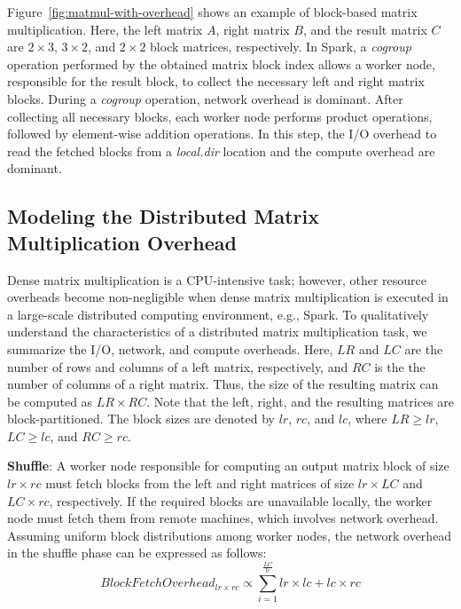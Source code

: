 \documentclass[10pt, conference, compsocconf]{IEEEtran}
\begin{document}
Figure~\ref{fig:matmul-with-overhead} shows an example of block-based matrix multiplication. Here, the left matrix $A$, right matrix $B$, and the result matrix $C$ are  $2 \times 3$,  $3 \times 2$, and $2 \times 2$ block matrices, respectively. In Spark, a \textit{cogroup} operation performed by the obtained matrix block index allows a worker node, responsible for the result block, to collect the necessary left and right matrix blocks. During a \textit{cogroup} operation, network overhead is dominant. After collecting all necessary blocks, each worker node performs product operations, followed by element-wise addition operations. In this step, the I/O overhead to read the fetched blocks from a \textit{local.dir} location and the compute overhead are dominant.

\subsection{Modeling the  Distributed Matrix Multiplication Overhead }\label{sec:overhead-modeling}
Dense matrix multiplication is a CPU-intensive task; however, other resource overheads become non-negligible when dense matrix multiplication is executed in a large-scale distributed computing environment, e.g., Spark. To qualitatively understand the characteristics of a distributed matrix multiplication task, we summarize the I/O, network, and compute overheads. Here, $LR$ and $LC$ are the number of rows and columns of a left matrix, respectively, and  $RC$ is the the number of columns of a right matrix. Thus, the size of the resulting matrix can be computed as $LR \times RC$. Note that the left, right, and the resulting matrices are block-partitioned. The block sizes are denoted by $lr$, $rc$, and $lc$, where $LR \geq lr$, $LC \geq lc$, and $RC \geq rc$.

\textbf{Shuffle}: A worker node responsible for computing an output matrix block of size $lr \times rc$ must fetch blocks from the left and right matrices of size  $lr \times LC$ and $LC \times rc$, respectively. If the required blocks are unavailable locally, the worker node must fetch them from remote machines, which involves network overhead. Assuming uniform block distributions among worker nodes, the network overhead in the shuffle phase can be expressed as follows:
\begin{equation}\label{eq:shuffle-overhead}
  BlockFetchOverhead_{lr \times rc} \propto \sum\limits_{i=1}^{\frac{LC}{lc}} lr \times lc + lc \times rc
\end{equation}
\end{document}
